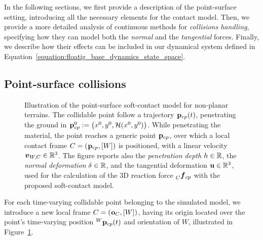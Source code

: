 In the following sections, we first provide a description of the point-surface setting, introducing all the necessary elements for the contact model.
Then, we provide a more detailed analysis of continuous methods for \emph{collisions handling}, specifying how they can model both the \emph{normal} and the \emph{tangential} forces.
Finally, we describe how their effects can be included in our dynamical system defined in Equation~\eqref{equation:floatig_base_dynamics_state_space}.

\subsection{Point-surface collisions}
\label{section:point-surface_collisions}

\begin{figure}
    \centering
    \caption{Illustration of the point-surface soft-contact model for non-planar terrains. The collidable point follow a trajectory $\pos_{cp}(t)$, penetrating the ground in $\pos_{cp}^0 := \left( x^0, y^0, \mathcal{H}(x^0, y^0) \right)$. While penetrating the material, the point reaches a generic point $\pos_{cp}$, over which a local contact frame $C = (\pos_{cp}, [W])$ is positioned, with a linear velocity $\vellin_{W,C} \in \realn^3$. The figure reports also the \emph{penetration depth} $h \in \realn$, the \emph{normal deformation} $\delta \in \realn$, and the tangential deformation $\mathbf{u} \in \realn^3$, used for the calculation of the 3D reaction force $\forcelin[C]_{cp}$ with the proposed soft-contact model.}
    \label{fig:soft_contact_model}
\end{figure}

For each time-varying collidable point belonging to the simulated model, we introduce a new local frame $C = (\ori_C, [W])$, having its origin located over the point's time-varying position $\pos[W]_{cp}(t)$ and orientation of $W$, illustrated in Figure~\ref{fig:soft_contact_model}.

